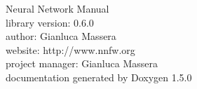 \documentclass[a4paper]{book}
\begin{document}
\begin{titlepage}
\vspace*{7cm}
\begin{center}
{\Huge Neural Network Manual}\\
\vspace*{1cm}
{\large library version: 0.6.0}\\
{\large author: Gianluca Massera}\\
{\large website: http://www.nnfw.org}\\
{\large project manager: Gianluca Massera}\\
{\large documentation generated by Doxygen 1.5.0}\\
\end{center}
\end{titlepage}
\clearemptydoublepage


\tableofcontents
\clearemptydoublepage







\printindex
\end{document}

